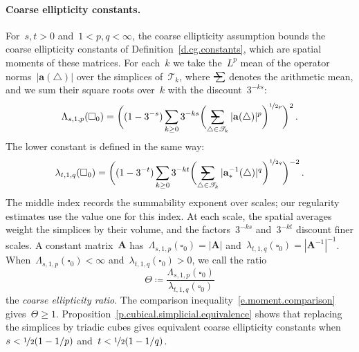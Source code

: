 \documentclass[11pt,letterpaper]{article}
\makeatletter
\numberwithin{equation}{section}
\theoremstyle{definition}
\renewcommand{\a}{\mathbf{a}}
\newcommand{\bfA}{\mathbf{A}}
\newcommand{\nf}{\nicefrac}
\newcommand{\cu}{\square}
\newcommand{\avsum}{\mathop{\mathpalette\avsuminner\relax}\displaylimits}
\newcommand\avsuminner[2]{%
	{\sbox0{$\m@th#1\sum$}%
		\vphantom{\usebox0}%
		\ooalign{%
			\hidewidth
			\smash{\,\rule[.23em]{8.8pt}{1.1pt} \relax}%
			\hidewidth\cr
			$\m@th#1\sum$\cr
		}%
	}%
}
\makeatother
\begin{document}
\paragraph{Coarse ellipticity constants.} For~$s,t>0$ and~$1<p,q<\infty$, the coarse ellipticity assumption bounds the coarse ellipticity constants of Definition~\ref{d.cg.constants}, which are spatial moments of these matrices. For each~$k$ we take the~$L^p$ mean of the operator norms~$|\a(\triangle)|$ over the simplices of~$\mathscr T_k$, where~$\avsum$ denotes the arithmetic mean, and we sum their square roots over~$k$ with the discount~$3^{-ks}$:
\begin{equation*}
	\Lambda_{s,1,p}(\cu_0)=\biggl((1-3^{-s})\sum_{k\geq0}3^{-ks}\biggl(\avsum_{\triangle\in\mathscr T_k}|\a(\triangle)|^p\biggr)^{\nf1{2p}}\biggr)^2\,.
\end{equation*}
The lower constant is defined in the same way:
\begin{equation*}
	\lambda_{t,1,q}(\cu_0)=\biggl((1-3^{-t})\sum_{k\geq0}3^{-kt}\biggl(\avsum_{\triangle\in\mathscr T_k}|\a_*^{-1}(\triangle)|^q\biggr)^{\nf1{2q}}\biggr)^{-2}\,.
\end{equation*}
The middle index records the summability exponent over scales;
our regularity estimates use the value one for this index. At each scale, the spatial averages weight the simplices by their volume, and the factors~$3^{-ks}$ and~$3^{-kt}$ discount finer scales. A constant matrix~$\bfA$ has~$\Lambda_{s,1,p}(\cu_0)=|\bfA|$ and~$\lambda_{t,1,q}(\cu_0)=|\bfA^{-1}|^{-1}$. When~$\Lambda_{s,1,p}(\cu_0)<\infty$ and~$\lambda_{t,1,q}(\cu_0)>0$, we call the ratio
\begin{equation}
	\Theta\coloneqq\frac{\Lambda_{s,1,p}(\cu_0)}{\lambda_{t,1,q}(\cu_0)}
	\label{e.spatial.moment.ratio}
\end{equation}
the \emph{coarse ellipticity ratio}. The comparison inequality~\eqref{e.moment.comparison} gives~$\Theta\geq1$. Proposition~\ref{p.cubical.simplicial.equivalence} shows that replacing the simplices by triadic cubes gives equivalent coarse ellipticity constants when~$s<\nf12(1-1/p)$ and~$t<\nf12(1-1/q)$.
\end{document}

